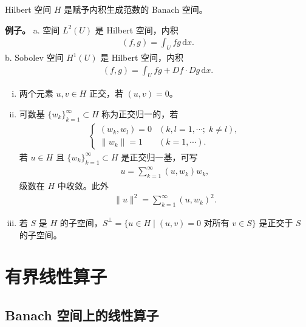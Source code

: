 \documentclass[../main.tex]{subfiles}
\begin{document}
\begin{definition}\label{definition:appD-Hilbert空间}
Hilbert 空间 $H$ 是赋予内积生成范数的 Banach 空间。
\end{definition}

\begin{remark}\label{remark:appD-Hilbert例子}
\textbf{例子。}
a. 空间 $L^2(U)$ 是 Hilbert 空间，内积
\begin{align*}
(f,g)=\int_U fg\,\mathrm{d}x.
\end{align*}
b. Sobolev 空间 $H^1(U)$ 是 Hilbert 空间，内积
\begin{align*}
(f,g)=\int_U fg+Df\cdot Dg\,\mathrm{d}x.
\end{align*}
\end{remark}

\begin{definition}\label{definition:appD-正交}
\begin{enumerate}[(i)]
\item 两个元素 $u,v\in H$ 正交，若 $(u,v)=0$。

\item 可数基 $\{w_k\}_{k=1}^\infty\subset H$ 称为正交归一的，若
\begin{align*}
\begin{cases}
(w_k,w_l)=0 & (k,l=1,\cdots;\;k\neq l),\\
\|w_k\|=1 & (k=1,\cdots).
\end{cases}
\end{align*}
若 $u\in H$ 且 $\{w_k\}_{k=1}^\infty\subset H$ 是正交归一基，可写
\begin{align*}
u=\sum_{k=1}^\infty(u,w_k)w_k,
\end{align*}
级数在 $H$ 中收敛。此外
\begin{align*}
\|u\|^2=\sum_{k=1}^\infty(u,w_k)^2.
\end{align*}

\item 若 $S$ 是 $H$ 的子空间，$S^\perp=\{u\in H\mid(u,v)=0\text{ 对所有 }v\in S\}$ 是正交于 $S$ 的子空间。
\end{enumerate}
\end{definition}

\section{有界线性算子}\label{section:appD-有界线性算子}

\subsection{Banach 空间上的线性算子}\label{subsection:appD-Banach算子}
\end{document}
